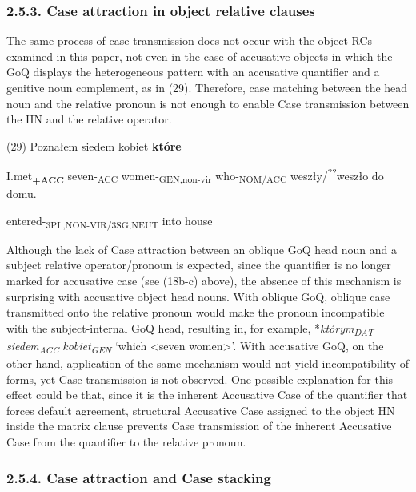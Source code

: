 \documentclass[output=paper]{langsci/langscibook}
\begin{document}
\subsubsection{ 2.5.3. Case attraction in object relative clauses}

The same process of case transmission does not occur with the object RCs examined in this paper, not even in the case of accusative objects in which the GoQ displays the heterogeneous pattern with an accusative quantifier and a genitive noun complement, as in (29). Therefore, case matching between the head noun and the relative pronoun is not enough to enable Case transmission between the HN and the relative operator.

 (29)  Poznałem siedem     kobiet     \textbf{które} 

  I.met\textbf{\textsubscript{+ACC}} seven-\textsubscript{ACC}   women-\textsubscript{GEN,non-vir}  who-\textsubscript{NOM/ACC}           weszły/\textsuperscript{??}weszło   do   domu.

  entered-\textsubscript{3PL,NON-VIR/3SG,NEUT}  into house

 

 

Although the lack of Case attraction between an oblique GoQ head noun and a subject relative operator/pronoun is expected, since the quantifier is no longer marked for accusative case (see (18b-c) above), the absence of this mechanism is surprising with accusative object head nouns. With oblique GoQ, oblique case transmitted onto the relative pronoun would make the pronoun incompatible with the subject-internal GoQ head, resulting in, for example, *\textit{którym\textsubscript{DAT}} \textit{siedem\textsubscript{ACC}} \textit{kobiet\textsubscript{GEN}} ‘which <seven women>’. With accusative GoQ, on the other hand, application of the same mechanism would not yield incompatibility of forms, yet Case transmission is not observed. One possible explanation for this effect could be that, since it is the inherent Accusative Case of the quantifier that forces default agreement, structural Accusative Case assigned to the object HN inside the matrix clause prevents Case transmission of the inherent Accusative Case from the quantifier to the relative pronoun. 

\subsubsection{ 2.5.4. Case attraction and Case stacking}
\end{document}
